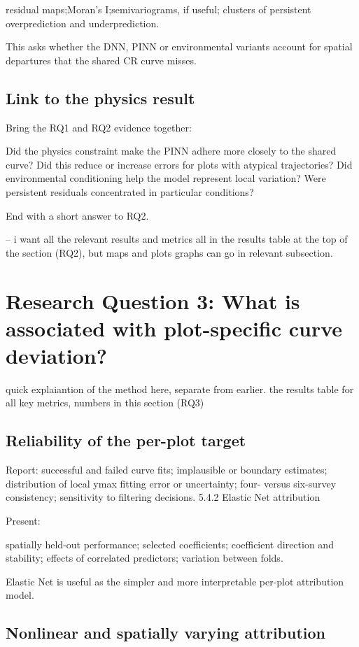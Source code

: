 residual maps;Moran’s I;semivariograms, if useful;
clusters of persistent overprediction and underprediction.

This asks whether the DNN, PINN or environmental variants account for spatial departures that the shared CR curve misses.
\subsection{Link to the physics result}

Bring the RQ1 and RQ2 evidence together:

Did the physics constraint make the PINN adhere more closely to the shared curve?
Did this reduce or increase errors for plots with atypical trajectories?
Did environmental conditioning help the model represent local variation?
Were persistent residuals concentrated in particular conditions?

End with a short answer to RQ2.

-- i want all the relevant results and metrics all in the results table at the top of the section (RQ2), but maps and plots graphs can go in relevant subsection. 

\section{Research Question 3: What is associated with plot-specific curve deviation?}
quick explaiantion of the method here, separate from earlier. 
the results table for all key metrics, numbers in this section (RQ3) 

\subsection{Reliability of the per-plot target}

Report:
successful and failed curve fits;
implausible or boundary estimates;
distribution of local ymax
fitting error or uncertainty;
four- versus six-survey consistency;
sensitivity to filtering decisions.
5.4.2 Elastic Net attribution

Present:

spatially held-out performance;
selected coefficients;
coefficient direction and stability;
effects of correlated predictors;
variation between folds.

Elastic Net is useful as the simpler and more interpretable per-plot attribution model.

\subsection{Nonlinear and spatially varying attribution}

